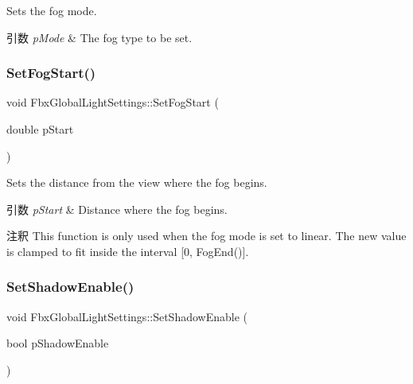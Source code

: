 Sets the fog mode. 
\begin{DoxyParams}{引数}
{\em p\+Mode} & The fog type to be set. \\
\hline
\end{DoxyParams}
\mbox{\label{class_fbx_global_light_settings_a5d8cf2b4c90e5cfedcd2169aa8321ebf}} 
\subsubsection{\texorpdfstring{Set\+Fog\+Start()}{SetFogStart()}}
{\footnotesize\ttfamily void Fbx\+Global\+Light\+Settings\+::\+Set\+Fog\+Start (\begin{DoxyParamCaption}\item[{double}]{p\+Start }\end{DoxyParamCaption})}

Sets the distance from the view where the fog begins. 
\begin{DoxyParams}{引数}
{\em p\+Start} & Distance where the fog begins. \\
\hline
\end{DoxyParams}
\begin{DoxyRemark}{注釈}
This function is only used when the fog mode is set to linear. The new value is clamped to fit inside the interval \mbox{[}0, Fog\+End()\mbox{]}. 
\end{DoxyRemark}
\mbox{\label{class_fbx_global_light_settings_a0e50d74c9f7f9be8446dde2e8c42ea31}} 
\subsubsection{\texorpdfstring{Set\+Shadow\+Enable()}{SetShadowEnable()}}
{\footnotesize\ttfamily void Fbx\+Global\+Light\+Settings\+::\+Set\+Shadow\+Enable (\begin{DoxyParamCaption}\item[{bool}]{p\+Shadow\+Enable }\end{DoxyParamCaption})}

